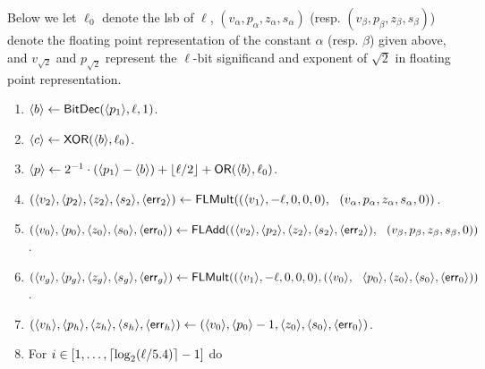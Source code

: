   Below we let $\ell_0$ denote the lsb of $\ell$,
$(v_\alpha,p_\alpha,z_\alpha,s_\alpha)$
  (resp.  $(v_\beta,p_\beta,z_\beta,s_\beta)$)
  denote the floating point representation of the constant $\alpha$ (resp. $\beta$)
  given above,
  and $v_{\sqrt{2}}$ and $p_{\sqrt{2}}$ represent the $\ell$-bit significand and exponent of
$\sqrt{2}$ in floating point representation.
  \begin{enumerate}
    \item $\langle b \rangle \leftarrow \mathsf{BitDec}(\langle p_1 \rangle,\ell,1)$.
    \item $\langle c \rangle \leftarrow \mathsf{XOR}(\langle b \rangle,\ell_0)$.
    \item $\langle p \rangle \leftarrow 2^{-1} \cdot (\langle p_1 \rangle-\langle b \rangle)
            +{\lfloor \ell/2 \rfloor}+\mathsf{OR}(\langle b \rangle,\ell_0)$.
    \item $(\langle v_2 \rangle,\langle p_2 \rangle,\langle z_2 \rangle,\langle s_2 \rangle,\langle \mathsf{err}_2 \rangle)
            \leftarrow \mathsf{FLMult}((\langle v_1 \rangle,-\ell,0,0,0),~~
		  (v_\alpha,p_\alpha,z_\alpha,s_\alpha,0))$.
    \item $(\langle v_0 \rangle,\langle p_0 \rangle,\langle z_0 \rangle,\langle s_0 \rangle,\langle \mathsf{err}_0 \rangle)
            \leftarrow \mathsf{FLAdd}((\langle v_2 \rangle,\langle p_2 \rangle,\langle z_2 \rangle,\langle s_2 \rangle,\langle \mathsf{err}_2 \rangle),~~
		  (v_\beta,p_\beta,z_\beta,s_\beta,0))$.
    \item $(\langle v_g \rangle,\langle p_g \rangle,\langle z_g \rangle,\langle s_g \rangle,\langle \mathsf{err}_g \rangle)
            \leftarrow \mathsf{FLMult}((\langle v_1 \rangle,-\ell,0,0,0),(\langle v_0 \rangle,~~
		  \langle p_0 \rangle,\langle z_0 \rangle,\langle s_0 \rangle,\langle \mathsf{err}_0 \rangle))$.
    \item  $(\langle v_h \rangle,\langle p_h \rangle,\langle z_h \rangle,\langle s_h \rangle,\langle \mathsf{err}_h \rangle)
            \leftarrow   (\langle v_0 \rangle,\langle p_0 \rangle-1,\langle z_0 \rangle,\langle s_0 \rangle,\langle \mathsf{err}_0 \rangle)$.
    \item For $i \in [1,\ldots,{\lceil \log_2(\ell/5.4) \rceil}-1]$ do
\end{enumerate}
